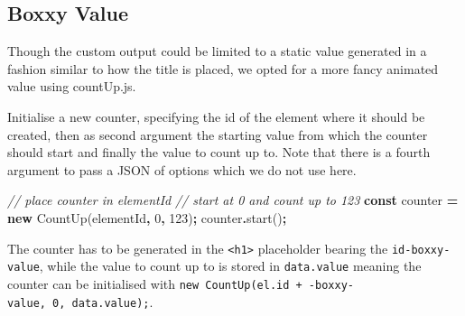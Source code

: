 \documentclass[
]{krantz}
\makeatletter
\newenvironment{Shaded}{\begin{snugshade}}{\end{snugshade}}
\newcommand{\CommentTok}[1]{\textcolor[rgb]{0.37,0.37,0.37}{\textit{#1}}}
\newcommand{\DecValTok}[1]{\textcolor[rgb]{0.06,0.06,0.06}{#1}}
\newcommand{\FunctionTok}[1]{\textcolor[rgb]{0,0,0}{#1}}
\newcommand{\KeywordTok}[1]{\textcolor[rgb]{0.27,0.27,0.27}{\textbf{#1}}}
\newcommand{\NormalTok}[1]{#1}
\newcommand{\OperatorTok}[1]{\textcolor[rgb]{0.43,0.43,0.43}{\textbf{#1}}}
\newcommand{\StringTok}[1]{\textcolor[rgb]{0.5,0.5,0.5}{#1}}
\newenvironment{kframe}{%
\medskip{}
\setlength{\fboxsep}{.8em}
 \def\at@end@of@kframe{}%
 \ifinner\ifhmode%
  \def\at@end@of@kframe{\end{minipage}}%
  \begin{minipage}{\columnwidth}%
 \fi\fi%
 \def\FrameCommand##1{\hskip\@totalleftmargin \hskip-\fboxsep
 \colorbox{shadecolor}{##1}\hskip-\fboxsep
     \hskip-\linewidth \hskip-\@totalleftmargin \hskip\columnwidth}%
 \MakeFramed {\advance\hsize-\width
   \@totalleftmargin\z@ \linewidth\hsize
   \@setminipage}}%
 {\par\unskip\endMakeFramed%
 \at@end@of@kframe}
\renewenvironment{Shaded}{\begin{kframe}}{\end{kframe}}
\makeatother
\begin{document}
\hypertarget{shiny-output-boxxy-value}{%
\subsection{Boxxy Value}\label{shiny-output-boxxy-value}}

Though the custom output could be limited to a static value generated in a fashion similar to how the title is placed, we opted for a more fancy animated value using countUp.js.

Initialise a new counter, specifying the id of the element where it should be created, then as second argument the starting value from which the counter should start and finally the value to count up to. Note that there is a fourth argument to pass a JSON of options which we do not use here.

\begin{Shaded}
\begin{Highlighting}[]
\CommentTok{// place counter in elementId}
\CommentTok{// start at 0 and count up to 123}
\KeywordTok{const}\NormalTok{ counter }\OperatorTok{=} \KeywordTok{new}\NormalTok{ CountUp(}\StringTok{\textquotesingle{}elementId\textquotesingle{}}\OperatorTok{,} \DecValTok{0}\OperatorTok{,} \DecValTok{123}\NormalTok{)}\OperatorTok{;}
\NormalTok{counter}\OperatorTok{.}\FunctionTok{start}\NormalTok{()}\OperatorTok{;}
\end{Highlighting}
\end{Shaded}

The counter has to be generated in the \texttt{\textless{}h1\textgreater{}} placeholder bearing the \texttt{id-boxxy-value}, while the value to count up to is stored in \texttt{data.value} meaning the counter can be initialised with \texttt{new\ CountUp(el.id\ +\ \textquotesingle{}-boxxy-value\textquotesingle{},\ 0,\ data.value);}.
\end{document}
